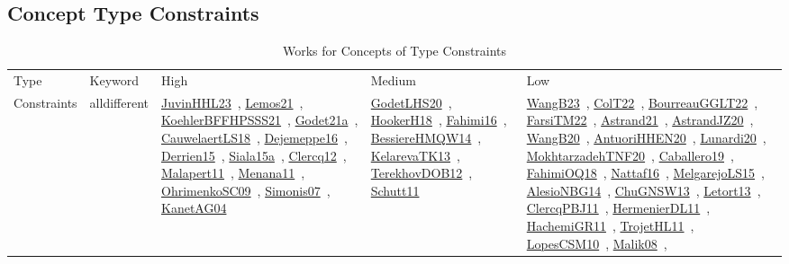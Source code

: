 \clearpage
\subsection{Concept Type Constraints}
\label{sec:Constraints}
{\scriptsize
\begin{longtable}{lp{3cm}>{\raggedright\arraybackslash}p{6cm}>{\raggedright\arraybackslash}p{6cm}>{\raggedright\arraybackslash}p{8cm}}
\rowcolor{white}\caption{Works for Concepts of Type Constraints}\\ \toprule
\rowcolor{white}Type & Keyword & High & Medium & Low\\ \midrule\endhead
\bottomrule
\endfoot
Constraints & alldifferent & \href{works/JuvinHHL23.pdf}{JuvinHHL23}~\cite{JuvinHHL23}, \href{works/Lemos21.pdf}{Lemos21}~\cite{Lemos21}, \href{works/KoehlerBFFHPSSS21.pdf}{KoehlerBFFHPSSS21}~\cite{KoehlerBFFHPSSS21}, \href{works/Godet21a.pdf}{Godet21a}~\cite{Godet21a}, \href{works/CauwelaertLS18.pdf}{CauwelaertLS18}~\cite{CauwelaertLS18}, \href{works/Dejemeppe16.pdf}{Dejemeppe16}~\cite{Dejemeppe16}, \href{works/Derrien15.pdf}{Derrien15}~\cite{Derrien15}, \href{works/Siala15a.pdf}{Siala15a}~\cite{Siala15a}, \href{works/Clercq12.pdf}{Clercq12}~\cite{Clercq12}, \href{works/Malapert11.pdf}{Malapert11}~\cite{Malapert11}, \href{works/Menana11.pdf}{Menana11}~\cite{Menana11}, \href{works/OhrimenkoSC09.pdf}{OhrimenkoSC09}~\cite{OhrimenkoSC09}, \href{works/Simonis07.pdf}{Simonis07}~\cite{Simonis07}, \href{works/KanetAG04.pdf}{KanetAG04}~\cite{KanetAG04} & \href{works/GodetLHS20.pdf}{GodetLHS20}~\cite{GodetLHS20}, \href{works/HookerH18.pdf}{HookerH18}~\cite{HookerH18}, \href{works/Fahimi16.pdf}{Fahimi16}~\cite{Fahimi16}, \href{works/BessiereHMQW14.pdf}{BessiereHMQW14}~\cite{BessiereHMQW14}, \href{works/KelarevaTK13.pdf}{KelarevaTK13}~\cite{KelarevaTK13}, \href{works/TerekhovDOB12.pdf}{TerekhovDOB12}~\cite{TerekhovDOB12}, \href{works/Schutt11.pdf}{Schutt11}~\cite{Schutt11} & \href{works/WangB23.pdf}{WangB23}~\cite{WangB23}, \href{works/ColT22.pdf}{ColT22}~\cite{ColT22}, \href{works/BourreauGGLT22.pdf}{BourreauGGLT22}~\cite{BourreauGGLT22}, \href{works/FarsiTM22.pdf}{FarsiTM22}~\cite{FarsiTM22}, \href{works/Astrand21.pdf}{Astrand21}~\cite{Astrand21}, \href{works/AstrandJZ20.pdf}{AstrandJZ20}~\cite{AstrandJZ20}, \href{works/WangB20.pdf}{WangB20}~\cite{WangB20}, \href{works/AntuoriHHEN20.pdf}{AntuoriHHEN20}~\cite{AntuoriHHEN20}, \href{works/Lunardi20.pdf}{Lunardi20}~\cite{Lunardi20}, \href{works/MokhtarzadehTNF20.pdf}{MokhtarzadehTNF20}~\cite{MokhtarzadehTNF20}, \href{works/Caballero19.pdf}{Caballero19}~\cite{Caballero19}, \href{works/FahimiOQ18.pdf}{FahimiOQ18}~\cite{FahimiOQ18}, \href{works/Nattaf16.pdf}{Nattaf16}~\cite{Nattaf16}, \href{works/MelgarejoLS15.pdf}{MelgarejoLS15}~\cite{MelgarejoLS15}, \href{works/AlesioNBG14.pdf}{AlesioNBG14}~\cite{AlesioNBG14}, \href{works/ChuGNSW13.pdf}{ChuGNSW13}~\cite{ChuGNSW13}, \href{works/Letort13.pdf}{Letort13}~\cite{Letort13}, \href{works/ClercqPBJ11.pdf}{ClercqPBJ11}~\cite{ClercqPBJ11}, \href{works/HermenierDL11.pdf}{HermenierDL11}~\cite{HermenierDL11}, \href{works/HachemiGR11.pdf}{HachemiGR11}~\cite{HachemiGR11}, \href{works/TrojetHL11.pdf}{TrojetHL11}~\cite{TrojetHL11}, \href{works/LopesCSM10.pdf}{LopesCSM10}~\cite{LopesCSM10}, \href{works/Malik08.pdf}{Malik08}~\cite{Malik08}, 
\end{longtable}}
